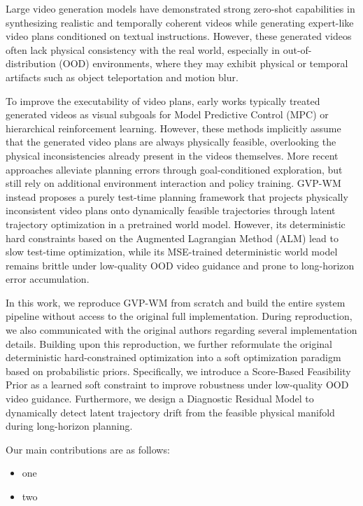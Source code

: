 Large video generation models have demonstrated strong zero-shot capabilities in synthesizing realistic and temporally coherent videos while generating expert-like video plans conditioned on textual instructions. However, these generated videos often lack physical consistency with the real world, especially in out-of-distribution (OOD) environments, where they may exhibit physical or temporal artifacts such as object teleportation and motion blur.

To improve the executability of video plans, early works typically treated generated videos as visual subgoals for Model Predictive Control (MPC) or hierarchical reinforcement learning. However, these methods implicitly assume that the generated video plans are always physically feasible, overlooking the physical inconsistencies already present in the videos themselves. More recent approaches alleviate planning errors through goal-conditioned exploration, but still rely on additional environment interaction and policy training. GVP-WM instead proposes a purely test-time planning framework that projects physically inconsistent video plans onto dynamically feasible trajectories through latent trajectory optimization in a pretrained world model. However, its deterministic hard constraints based on the Augmented Lagrangian Method (ALM) lead to slow test-time optimization, while its MSE-trained deterministic world model remains brittle under low-quality OOD video guidance and prone to long-horizon error accumulation.

In this work, we reproduce GVP-WM from scratch and build the entire system pipeline without access to the original full implementation. During reproduction, we also communicated with the original authors regarding several implementation details. Building upon this reproduction, we further reformulate the original deterministic hard-constrained optimization into a soft optimization paradigm based on probabilistic priors. Specifically, we introduce a Score-Based Feasibility Prior as a learned soft constraint to improve robustness under low-quality OOD video guidance. Furthermore, we design a Diagnostic Residual Model to dynamically detect latent trajectory drift from the feasible physical manifold during long-horizon planning.


Our main contributions are as follows:
\begin{itemize}
    \item one
    \item two
\end{itemize}


